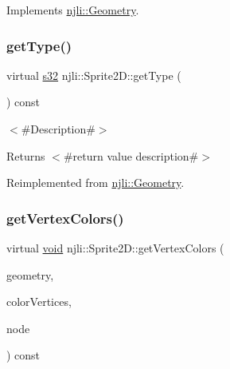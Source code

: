 Implements \mbox{\hyperlink{classnjli_1_1_geometry_ae54ead1ba785a8c2207b197d8e419abe}{njli\+::\+Geometry}}.

\mbox{\label{classnjli_1_1_sprite2_d_a57e7a9f75af0208001c075120f1ece3c}} 
\subsubsection{\texorpdfstring{get\+Type()}{getType()}}
{\footnotesize\ttfamily virtual \mbox{\hyperlink{_util_8h_aa62c75d314a0d1f37f79c4b73b2292e2}{s32}} njli\+::\+Sprite2\+D\+::get\+Type (\begin{DoxyParamCaption}{ }\end{DoxyParamCaption}) const\hspace{0.3cm}{\ttfamily [virtual]}}

$<$\#\+Description\#$>$

\begin{DoxyReturn}{Returns}
$<$\#return value description\#$>$ 
\end{DoxyReturn}


Reimplemented from \mbox{\hyperlink{classnjli_1_1_geometry_ac13aedbb6914e12416c46574805cb13a}{njli\+::\+Geometry}}.

\mbox{\label{classnjli_1_1_sprite2_d_ac17cc53c2a39003e8459e990102a23fb}} 
\subsubsection{\texorpdfstring{get\+Vertex\+Colors()}{getVertexColors()}\hspace{0.1cm}{\footnotesize\ttfamily [1/2]}}
{\footnotesize\ttfamily virtual \mbox{\hyperlink{_thread_8h_af1e856da2e658414cb2456cb6f7ebc66}{void}} njli\+::\+Sprite2\+D\+::get\+Vertex\+Colors (\begin{DoxyParamCaption}\item[{\mbox{\hyperlink{classnjli_1_1_level_of_detail}{Level\+Of\+Detail}} $\ast$}]{geometry,  }\item[{bt\+Vector4 $\ast$$\ast$}]{color\+Vertices,  }\item[{\mbox{\hyperlink{classnjli_1_1_node}{Node}} $\ast$}]{node }\end{DoxyParamCaption}) const\hspace{0.3cm}{\ttfamily [virtual]}}

